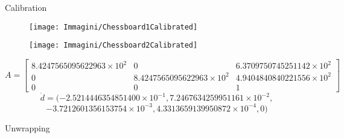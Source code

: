 \begin{frame}{Calibration}
	\begin{figure}[H]
		\begin{minipage}{0.48\linewidth}
			\texttt{[image: Immagini/Chessboard1Calibrated]}
		\end{minipage}
		\vspace{0.04\linewidth}
		\begin{minipage}{0.48\linewidth}
			\texttt{[image: Immagini/Chessboard2Calibrated]}
		\end{minipage}
	\end{figure}
	\stsize
	\[A=\begin{bmatrix}
		8.4247565095622963\times10^2 & 0 & 6.3709750745251142\times10^2\\
		0 & 8.4247565095622963\times10^2 & 4.9404840840221556\times10^2\\
		0 & 0 & 1
	\end{bmatrix}\]\[
	\dot{d}=(-2.5214446354851400\times10^{-1}, 7.2467634259951161\times10^{-2},\]\[-3.7212601356153754\times10^{-3}, 4.3313659139950872\times10^{-4}, 0)
	\]
\end{frame}

\begin{frame}{Unwrapping}
	
\end{frame}











